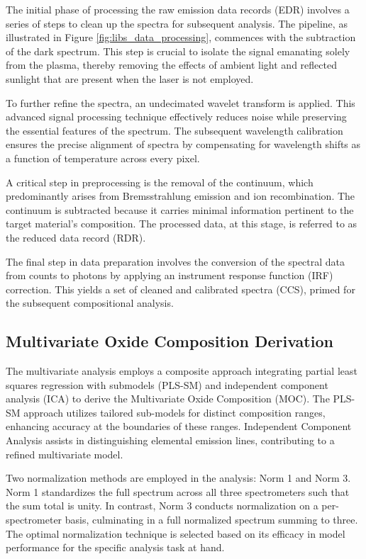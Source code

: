 The initial phase of processing the raw emission data records (EDR) involves a series of steps to clean up the spectra for subsequent analysis.
The pipeline, as illustrated in Figure \ref{fig:libs_data_processing}, commences with the subtraction of the dark spectrum.
This step is crucial to isolate the signal emanating solely from the plasma, thereby removing the effects of ambient light and reflected sunlight that are present when the laser is not employed.

To further refine the spectra, an undecimated wavelet transform is applied.
This advanced signal processing technique effectively reduces noise while preserving the essential features of the spectrum.
The subsequent wavelength calibration ensures the precise alignment of spectra by compensating for wavelength shifts as a function of temperature across every pixel.

A critical step in preprocessing is the removal of the continuum, which predominantly arises from Bremsstrahlung emission and ion recombination.
The continuum is subtracted because it carries minimal information pertinent to the target material's composition.
The processed data, at this stage, is referred to as the reduced data record (RDR).

The final step in data preparation involves the conversion of the spectral data from counts to photons by applying an instrument response function (IRF) correction.
This yields a set of cleaned and calibrated spectra (CCS), primed for the subsequent compositional analysis.

\subsection{Multivariate Oxide Composition Derivation}\label{sec:moc_derivation}

The multivariate analysis employs a composite approach integrating partial least squares regression with submodels (PLS-SM) and independent component analysis (ICA) to derive the Multivariate Oxide Composition (MOC).
The PLS-SM approach utilizes tailored sub-models for distinct composition ranges, enhancing accuracy at the boundaries of these ranges.
Independent Component Analysis assists in distinguishing elemental emission lines, contributing to a refined multivariate model.

Two normalization methods are employed in the analysis: Norm 1 and Norm 3.
Norm 1 standardizes the full spectrum across all three spectrometers such that the sum total is unity.
In contrast, Norm 3 conducts normalization on a per-spectrometer basis, culminating in a full normalized spectrum summing to three.
The optimal normalization technique is selected based on its efficacy in model performance for the specific analysis task at hand.

